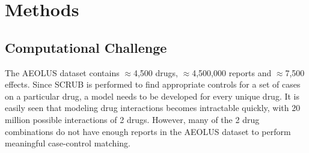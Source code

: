 \documentclass{ws-procs11x85}
\begin{document}
\section{Methods}

\subsection{Computational Challenge}

The AEOLUS dataset contains $\approx$4,500 drugs, $\approx$4,500,000
reports and $\approx$7,500 effects. Since SCRUB is performed to find
appropriate controls for a set of cases on a particular drug, a model
needs to be developed for every unique drug. It is easily seen that
modeling drug interactions becomes intractable quickly, with 20
million possible interactions of 2 drugs.  However, many of the 2 drug
combinations do not have enough reports in the AEOLUS dataset to
perform meaningful case-control matching.




\end{document}
